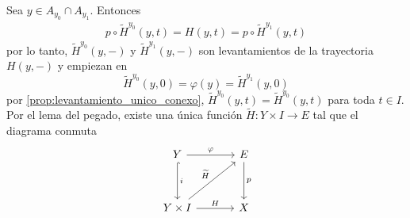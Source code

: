 \begin{dem}
    Sea $y\in A_{y_0}\cap A_{y_1}$. Entonces 
    \begin{align*}
        p\circ \widetilde{H}^{y_0}(y,t)=H(y,t)=p\circ \widetilde{H}^{y_1}(y,t)
    \end{align*}
    por lo tanto, $\widetilde{H}^{y_0}(y,-)$ y $\widetilde{H}^{y_1}(y,-)$ son levantamientos de la trayectoria $H(y,-)$ y empiezan en
    \begin{equation*}
        \widetilde{H}^{y_0}(y,0)=\varphi(y)=\widetilde{H}^{y_1}(y,0)
    \end{equation*}
    por \ref{prop:levantamiento_unico_conexo}, $\widetilde{H}^{y_0}(y,t)=\widetilde{H}^{y_0}(y,t)$ para toda $t\in I$. Por el lema del pegado, existe una única función $\widetilde{H}:Y\times I\to E$ tal que el diagrama conmuta
    \begin{equation*}
        \begin{tikzcd}[row sep=1.2cm, column sep=1.2cm]
            Y \arrow[r,"\varphi"] \arrow[hook,d, "i"] & E\arrow[d, "p"]\\
            Y\times I \arrow[r, "H"]\arrow[ur, "\widetilde{H}"] & X
        \end{tikzcd}
    \end{equation*}
\end{dem}

